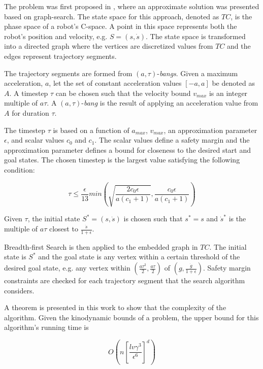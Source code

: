 The problem was first proposed in \cite{donald1993kinodynamic}, where an approximate solution was presented based on graph-search. The state space for this approach, denoted as $TC$, is the phase space of a robot's C-space. A point in this space represents both the robot's position and velocity, e.g. $S=(s, \dot{s})$. The state space is transformed into a directed graph where the vertices are discretized values from $TC$ and the edges represent trajectory segments.

The trajectory segments are formed from $(a, \tau)$-\emph{bangs}. Given a maximum acceleration, $a$, let the set of constant acceleration values $[-a,a]$ be denoted as $A$. A timestep $\tau$ can be chosen such that the velocity bound $v_{max}$ is an integer multiple of $a\tau$. A $(a, \tau)$-\emph{bang} is the result of applying an acceleration value from $A$ for duration $\tau$. 

The timestep $\tau$ is based on a function of $a_{max}$, $v_{max}$, an approximation parameter $\epsilon$, and scalar values $c_0$ and $c_1$. The scalar values define a safety margin and the approximation parameter defines a bound for closeness to the desired start and goal states. The chosen timestep is the largest value satisfying the following condition:

\begin{equation}
\tau \leq \frac{\epsilon}{13} min\left( \sqrt{ \frac{2c_0\epsilon}{a(c_1+1)}}, \frac{c_0\epsilon}{a(c_1+1)}\right)
\end{equation}

Given $\tau$, the initial state $S^*=(s, \dot{s})$ is chosen such that $s^* = s$ and $\dot{s}^*$ is the multiple of $a\tau$ closest to $\frac{\dot{s}}{1+\epsilon}$. 

Breadth-first Search is then applied to the embedded graph in $TC$. The initial state is $S^*$ and the goal state is any vertex within a certain threshold of the desired goal state, e.g. any vertex within $\left( \frac{a\tau^2}{2}, \frac{a\tau}{2} \right)$ of $\left(g, \frac{\dot{g}}{1+\epsilon}\right)$. Safety margin constraints are checked for each trajectory segment that the search algorithm considers.


A theorem is presented in this work to show that the complexity of the algorithm. Given the kinodynamic bounds of a problem, the upper bound for this algorithm's running time is


\begin{equation}
O\left( n \left[ \frac{lv\gamma^3}{\epsilon^6} \right] ^d \right)
\end{equation}

